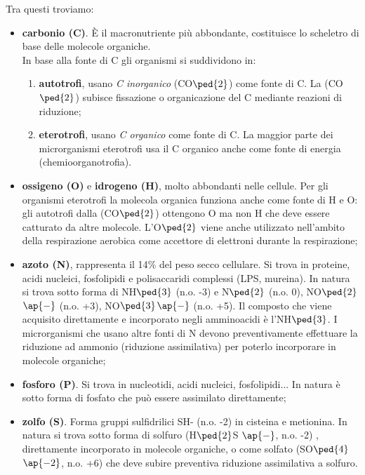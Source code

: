\documentclass[11pt]{book}
\begin{document}
Tra questi troviamo:
\begin{itemize}
\item \textbf{carbonio (C)}. \`E il macronutriente più abbondante, costituisce lo scheletro di base delle molecole organiche.\\
In base alla fonte di C gli organismi si suddividono in:
\begin{enumerate}
\item \textbf{autotrofi}, usano \emph{C inorganico} (CO$\ped{2}$) come fonte di C. La (CO$\ped{2}$) subisce fissazione o organicazione del C mediante reazioni di riduzione;
\item \textbf{eterotrofi}, usano \emph{C organico }come fonte di C. La maggior parte dei microrganismi eterotrofi usa il C organico anche come fonte di energia (chemioorganotrofia).
\end{enumerate}

\item \textbf{ossigeno (O)} e \textbf{idrogeno (H)}, molto abbondanti nelle cellule. Per gli organismi eterotrofi la molecola organica funziona anche come fonte di H e O: gli autotrofi dalla (CO$\ped{2}$) ottengono O ma
non H che deve essere catturato da altre molecole. L’O$\ped{2}$ viene anche utilizzato nell’ambito della respirazione aerobica come accettore di elettroni durante la respirazione;
\item \textbf{azoto (N)}, rappresenta il 14$\%$ del peso secco cellulare. Si trova in proteine, acidi nucleici, fosfolipidi e polisaccaridi complessi (LPS, mureina). In natura si trova sotto forma di NH$\ped{3}$ (n.o. -3) e N$\ped{2}$ (n.o. 0), NO$\ped{2}$$\ap{-}$ (n.o. +3), NO$\ped{3}$$\ap{-}$ (n.o. +5). Il composto che viene acquisito direttamente e incorporato negli amminoacidi è l’NH$\ped{3}$. I microrganismi che usano altre fonti di N devono preventivamente effettuare la riduzione ad ammonio (riduzione assimilativa) per poterlo incorporare in molecole organiche;
\item \textbf{fosforo (P)}. Si trova in nucleotidi, acidi nucleici, fosfolipidi... In natura è sotto forma di fosfato che può essere assimilato direttamente;
\item \textbf{zolfo (S)}. Forma gruppi sulfidrilici SH- (n.o. -2) in cisteina e metionina. In natura si trova sotto forma di solfuro (H$\ped{2}$S $\ap{-}$, n.o. -2) , direttamente incorporato in molecole organiche, o come solfato (SO$\ped{4}$$\ap{-2}$, n.o. +6) che deve subire preventiva riduzione assimilativa a solfuro.
\end{itemize}
\end{document}
